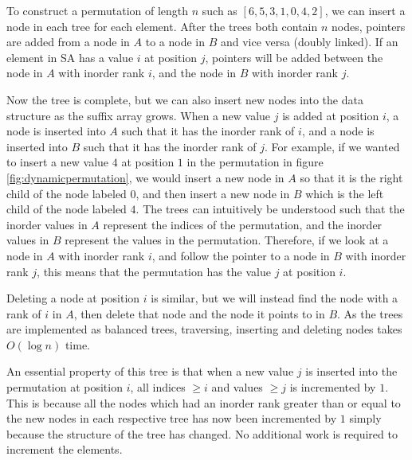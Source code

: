 To construct a permutation of length $n$ such as $[6,5,3,1,0,4,2]$, we can insert a node
in each tree for each element. After the trees both contain $n$ nodes, pointers are added
from a node in $A$ to a node in $B$ and vice versa (doubly linked). If an element in SA
has a value $i$ at position $j$, pointers will be added between the node in $A$ with
inorder rank $i$, and the node in $B$ with inorder rank $j$. 

Now the tree is complete, but we can also insert new nodes into the data structure as the
suffix array grows. When a new value $j$ is added at position $i$, a node is inserted into
$A$ such that it has the inorder rank of $i$, and a node is inserted into $B$ such that it
has the inorder rank of $j$. For example, if we wanted to insert a new value $4$ at
position $1$ in the permutation in figure \ref{fig:dynamicpermutation}, we would insert a
new node in $A$ so that it is the right child of the node labeled $0$, and then insert a
new node in $B$ which is the left child of the node labeled $4$. The trees can intuitively
be understood such that the inorder values in $A$ represent the indices of the
permutation, and the inorder values in $B$ represent the values in the permutation.
Therefore, if we look at a node in $A$ with inorder rank $i$, and follow the pointer to a
node in $B$ with inorder rank $j$, this means that the permutation has the value $j$ at
position $i$. 

Deleting a node at position $i$ is similar, but we will instead find the node with a rank
of $i$ in $A$, then delete that node and the node it points to in $B$. As the trees are
implemented as balanced trees, traversing, inserting and deleting nodes takes $O(\log n)$
time.

An essential property of this tree is that when a new value $j$ is inserted into the
permutation at position $i$, all indices $\geq i$ and values $\geq j$ is incremented by
$1$. This is because all the nodes which had an inorder rank greater than or equal to the
new nodes in each respective tree has now been incremented by $1$ simply because the
structure of the tree has changed. No additional work is required to increment the
elements. 

